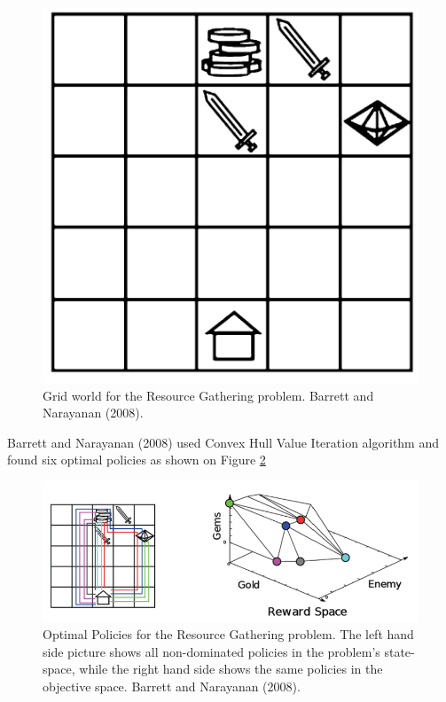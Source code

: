 \begin{figure}[ht]
\vskip 0.2in
\centering
\includegraphics[scale=0.6]{rg.png}
\caption{Grid world for the Resource Gathering problem. Barrett and Narayanan (2008).}
\label{fig:RGOverview}
\end{figure}

Barrett and Narayanan (2008)\nocite{barrett2008learning} used Convex Hull Value Iteration algorithm and found six optimal policies as shown on Figure \ref{fig:RGAlloptimalPolicies}

\begin{figure}[ht]
\vskip 0.2in
\centering
\includegraphics[scale=0.8]{rgpareto.png}
\caption{Optimal Policies for the Resource Gathering problem. The left hand side picture shows all non-dominated policies in the problem's state-space, while the right hand side shows the same policies in the objective space. Barrett and Narayanan (2008).}
\label{fig:RGAlloptimalPolicies}
\end{figure} 
